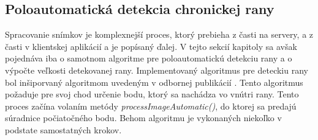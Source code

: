 \subsection{Poloautomatická detekcia chronickej rany}
Spracovanie snímkov je komplexnejší proces, ktorý prebieha z časti na servery, a z časti v klientskej aplikácií a je popísaný ďalej. V tejto sekcií kapitoly sa avšak pojednáva iba o samotnom algoritme pre poloautomatickú detekciu rany a o výpočte veľkosti detekovanej rany. Implementovaný algoritmus pre deteckiu rany bol inšiporvaný algoritmom uvedeným v odbornej publikácií \cite{AHMADFAUZI201574}. Tento algoritmus požaduje pre svoj chod určenie bodu, ktorý sa nachádza vo vnútri rany. Tento proces začína volaním metódy \textit{processImageAutomatic()}, do ktorej sa predajú súradnice počiatočného bodu. Behom algoritmu je vykonaných niekoľko v podstate samostatných krokov. 
